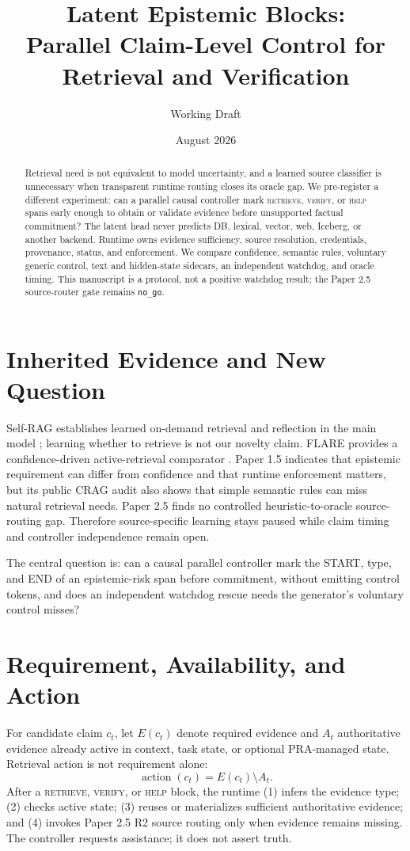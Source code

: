 \documentclass[10pt]{article}
\title{Latent Epistemic Blocks:\\Parallel Claim-Level Control for Retrieval and Verification}
\author{Working Draft}\date{August 2026}
\begin{document}
\maketitle

\begin{abstract}
Retrieval need is not equivalent to model uncertainty, and a learned source
classifier is unnecessary when transparent runtime routing closes its oracle
gap. We pre-register a different experiment: can a parallel causal controller
mark \textsc{retrieve}, \textsc{verify}, or \textsc{help} spans early enough to
obtain or validate evidence before unsupported factual commitment? The latent
head never predicts DB, lexical, vector, web, Iceberg, or another backend.
Runtime owns evidence sufficiency, source resolution, credentials, provenance,
status, and enforcement. We compare confidence, semantic rules, voluntary
generic control, text and hidden-state sidecars, an independent watchdog, and
oracle timing. This manuscript is a protocol, not a positive watchdog result;
the Paper 2.5 source-router gate remains \texttt{no\_go}.
\end{abstract}

\section{Inherited Evidence and New Question}
Self-RAG establishes learned on-demand retrieval and reflection in the main
model \cite{selfrag}; learning whether to retrieve is not our novelty claim.
FLARE provides a confidence-driven active-retrieval comparator \cite{flare}.
Paper 1.5 indicates that epistemic requirement can differ from confidence and
that runtime enforcement matters, but its public CRAG audit also shows that
simple semantic rules can miss natural retrieval needs. Paper 2.5 finds no
controlled heuristic-to-oracle source-routing gap. Therefore source-specific
learning stays paused while claim timing and controller independence remain
open.

The central question is: can a causal parallel controller mark the START, type,
and END of an epistemic-risk span before commitment, without emitting control
tokens, and does an independent watchdog rescue needs the generator's voluntary
control misses?

\section{Requirement, Availability, and Action}
For candidate claim $c_t$, let $E(c_t)$ denote required evidence and
$A_t$ authoritative evidence already active in context, task state, or optional
PRA-managed state. Retrieval action is not requirement alone:
\[
\operatorname{action}(c_t)=E(c_t)\setminus A_t.
\]
After a \textsc{retrieve}, \textsc{verify}, or \textsc{help} block, the runtime
(1) infers the evidence type; (2) checks active state; (3) reuses or materializes
sufficient authoritative evidence; and (4) invokes Paper 2.5 R2 source routing
only when evidence remains missing. The controller requests assistance; it does
not assert truth.
\end{document}
